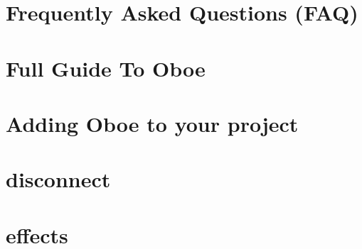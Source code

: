 \let\mypdfximage\pdfximage\def\pdfximage{\immediate\mypdfximage}\documentclass[twoside]{book}
\newcommand{\+}{\discretionary{\mbox{\scriptsize$\hookleftarrow$}}{}{}}
\begin{document}
\chapter{Frequently Asked Questions (F\+AQ)}
\label{md__c_1__users_fab_src__github_branches__neural_amp_modeler_plugin_i_plug2__dependencies__build_64037a989911c34b067be4cfcec29c08}

\chapter{Full Guide To Oboe}
\label{md__c_1__users_fab_src__github_branches__neural_amp_modeler_plugin_i_plug2__dependencies__build_792ebf14d61241f1c636bb6108d30e6d}

\chapter{Adding Oboe to your project}
\label{md__c_1__users_fab_src__github_branches__neural_amp_modeler_plugin_i_plug2__dependencies__build_2b898ed20b99f4bf80176ac8c1a32cb1}

\chapter{disconnect}
\label{md__c_1__users_fab_src__github_branches__neural_amp_modeler_plugin_i_plug2__dependencies__build_037af939505f8eeee38e9757a19b4612}

\chapter{effects}
\label{md__c_1__users_fab_src__github_branches__neural_amp_modeler_plugin_i_plug2__dependencies__build_e28cd3381dac17886786f064f66eb90d}

\end{document}
